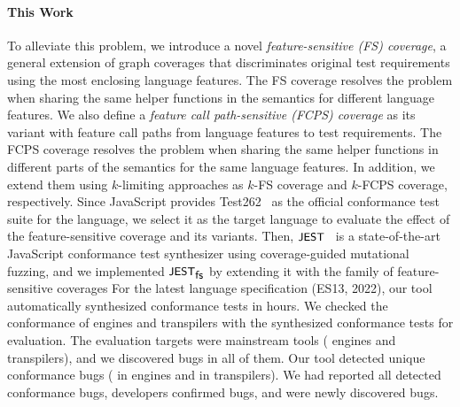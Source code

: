 
\paragraph{\textbf{This Work}}

To alleviate this problem, we introduce a novel \textit{feature-sensitive (FS)
coverage}, a general extension of graph coverages that discriminates original
test requirements using the most enclosing language features.
%
The FS coverage resolves the problem when sharing the same helper functions
in the semantics for different language features.
%
We also define a \textit{feature call path-sensitive (FCPS) coverage} as its
variant with feature call paths from language features to test requirements.
%
The FCPS coverage resolves the problem when sharing the same helper functions in
different parts of the semantics for the same language features.
%
In addition, we extend them using $k$-limiting approaches as $k$-FS
coverage and $k$-FCPS coverage, respectively.
%
Since JavaScript provides Test262~\cite{test262} as the official conformance
test suite for the language, we select it as the target language to evaluate the
effect of the feature-sensitive coverage and its variants.
%
Then, $\textsf{\small JEST}$~\cite{jest} is a state-of-the-art JavaScript conformance test
synthesizer using coverage-guided mutational fuzzing, and we implemented $\textsf{\small JEST}_{\textsf{\small fs}}$
by extending it with the family of feature-sensitive coverages
%
For the latest language specification (ES13, 2022), our tool automatically
synthesized  conformance tests in  hours.
%
We checked the conformance of engines and transpilers with the synthesized
conformance tests for evaluation.
%
The evaluation targets were  mainstream tools ( engines
and  transpilers), and we discovered bugs in all of them.
%
Our tool detected  unique conformance bugs ( in engines and
 in transpilers).
%
We had reported all detected conformance bugs, developers confirmed 
bugs, and  were newly discovered bugs.


